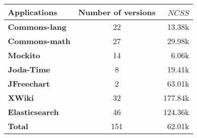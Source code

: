 \begin{tabular}{ l | c r } \textbf{Applications} & \textbf{Number of versions} & \textbf{$\overline{NCSS}$}\\
\hline 
\textbf{ Commons-lang } & 22 & 13.38k \\
\textbf{ Commons-math }  & 27 & 29.98k \\
\textbf{ Mockito } & 14 & 6.06k \\
\textbf{ Joda-Time } & 8 & 19.41k \\
\textbf{ JFreechart } & 2 & 63.01k \\
\textbf{ XWiki } & 32 & 177.84k \\
\textbf{ Elasticsearch } & 46 & 124.36k \\
\textbf{ Total } & 151 & 62.01k \\
\end{tabular}